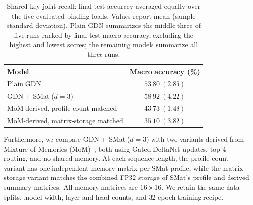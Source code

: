 \begin{table}[t]
\centering
\begin{tabular}{lc}
\hline
Model & Macro accuracy (\%) \\
\hline
Plain GDN & $53.80\ (2.86)$ \\
GDN + SMat ($d=3$) & $\mathbf{58.92\ (4.22)}$ \\
MoM-derived, profile-count matched & $43.73\ (1.48)$ \\
MoM-derived, matrix-storage matched & $35.10\ (3.82)$ \\
\hline
\end{tabular}
\caption{Shared-key joint recall: final-test accuracy averaged
equally over the five evaluated binding loads. Values report
mean (sample standard deviation). Plain GDN summarizes the
middle three of five runs ranked by final-test macro accuracy,
excluding the highest and lowest scores; the remaining models
summarize all three runs.}
\label{tab:mom_macro}
\end{table}

Furthermore, we compare GDN + SMat ($d=3$) with two variants derived
from Mixture-of-Memories (MoM)~\cite{du2026mom}, both using Gated
DeltaNet updates, top-4 routing, and no shared memory. At each
sequence length, the profile-count variant has one independent
memory matrix per SMat profile, while the matrix-storage variant
matches the combined FP32 storage of SMat's profile and derived
summary matrices. All memory matrices are $16 \times 16$.
We retain the same data splits, model width, layer and head counts,
and 32-epoch training recipe.

